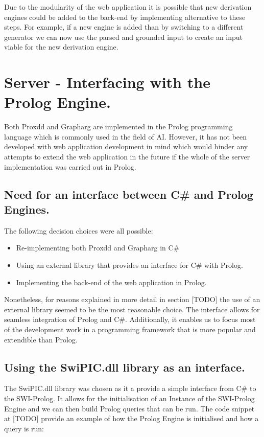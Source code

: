Due to the modularity of the web application it is possible that new derivation engines could be added to the back-end by implementing alternative to these steps. For example, if a new engine is added than by switching to a different generator we can now use the parsed and grounded input to create an input viable for the new derivation engine.

\section{Server - Interfacing with the Prolog Engine.}

Both Proxdd and Grapharg are implemented in the Prolog programming language which is commonly used in the field of AI. However, it has not been developed with web application development in mind which would hinder any attempts to extend the web application in the future if the whole of the server implementation was carried out in Prolog. 

\subsection{Need for an interface between C\# and Prolog Engines.}

The following decision choices were all possible:

\begin{itemize}
\item Re-implementing both Proxdd and Grapharg in C\#
\item Using an external library that provides an interface for C\# with Prolog.
\item Implementing the back-end of the web application in Prolog.
\end{itemize}

Nonetheless, for reasons explained in more detail in section [TODO] the use of an external library seemed to be the most reasonable choice. The interface allows for seamless integration of Prolog and C\#. Additionally, it enables us to focus most of the development work in a programming framework that is more popular and extendible than Prolog.

\subsection{Using the SwiPIC.dll library as an interface.}

The SwiPIC.dll library was chosen as it a provide a simple interface from C\# to the SWI-Prolog. It allows for the initialisation of an Instance of the SWI-Prolog Engine and we can then build Prolog queries that can be run. The code snippet at [TODO] provide an example of how the Prolog Engine is initialised and how a query is run:

